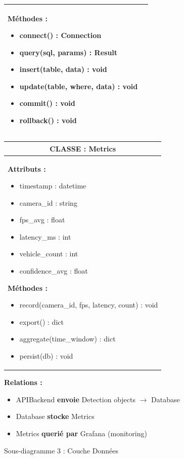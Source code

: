 \begin{figure}[H]
{\begin{minipage}{0.95\textwidth}
\begin{tabular}{|p{2.5cm}|p{7cm}|}
{    \textbf{Méthodes :}
    \begin{itemize}
        \item connect() : Connection
        \item query(sql, params) : Result
        \item insert(table, data) : void
        \item update(table, where, data) : void
        \item commit() : void
        \item rollback() : void
    \end{itemize}
    } \\
    \hline
    \end{tabular}
    
    \vspace{0.5cm}
    
    \begin{tabular}{|p{2.5cm}|p{7cm}|}
    \hline
    \multicolumn{2}{|c|}{\textbf{CLASSE : Metrics}} \\
    \hline
    \multicolumn{2}{|p{9.5cm}|}{
    \textbf{Attributs :}
    \begin{itemize}
        \item timestamp : datetime
        \item camera\_id : string
        \item fps\_avg : float
        \item latency\_ms : int
        \item vehicle\_count : int
        \item confidence\_avg : float
    \end{itemize}
    
    \textbf{Méthodes :}
    \begin{itemize}
        \item record(camera\_id, fps, latency, count) : void
        \item export() : dict
        \item aggregate(time\_window) : dict
        \item persist(db) : void
    \end{itemize}
    } \\
    \hline
    \end{tabular}
    
    \vspace{0.5cm}
    
    \textbf{Relations :}
    \begin{itemize}
        \item APIBackend \textbf{envoie} Detection objects $\rightarrow$ Database
        \item Database \textbf{stocke} Metrics
        \item Metrics \textbf{querié par} Grafana (monitoring)
    \end{itemize}
    
    \end{minipage}}
    \caption{Sous-diagramme 3 : Couche Données}
    \label{fig:class-data}
\end{figure}

